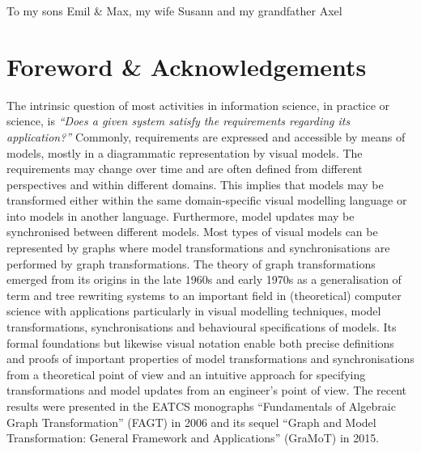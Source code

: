 \documentclass{eceasst}
\renewcommand{\covers}[1]{}
\begin{document}
\covers{}

\frontmatter

\null\newpage

\thispagestyle{plain}
\begin{flushright}
\vspace*{8cm}
\huge
To my sons Emil \& Max, my wife Susann and my grandfather \dag Axel
\end{flushright}
\clearpage
\null\newpage

\chapter*{Foreword \& Acknowledgements}
The intrinsic question of most activities in information science, in practice or science, is \textit{``Does a given system satisfy the requirements regarding its application?''}
Commonly, requirements are expressed and accessible by means of models, mostly in a diagrammatic representation by visual models.
The requirements may change over time and are often defined from different perspectives and within different domains.
This implies that models may be transformed either within the same domain-specific visual modelling language or into models in another language.
Furthermore, model updates may be synchronised between different models. %
Most types of visual models can be represented by graphs where model transformations and synchronisations are performed by graph transformations.
The theory of graph transformations emerged from its origins in the late 1960s and early 1970s as a generalisation of term and tree rewriting systems to an important field in (theoretical) computer science with applications particularly in visual modelling techniques, model transformations, synchronisations and behavioural specifications of models.
Its formal foundations but likewise visual notation enable both precise definitions and proofs of important properties of model transformations and synchronisations from a theoretical point of view and an intuitive approach for specifying transformations and model updates from an engineer's point of view.
The recent results were presented in the EATCS monographs ``Fundamentals of Algebraic Graph Transformation'' (FAGT) in 2006 and its sequel ``Graph and Model Transformation: General Framework and Applications'' (GraMoT) in 2015.
\end{document}
